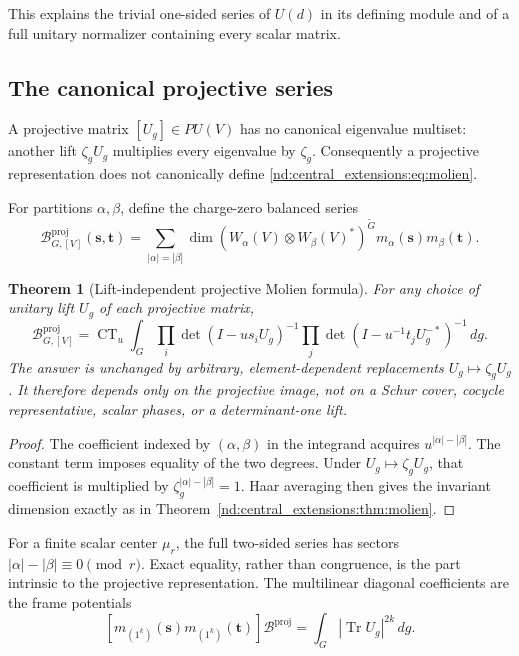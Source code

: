 \documentclass[10pt]{article}
\newcommand{\Tr}{\operatorname{Tr}}
\newcommand{\CT}{\operatorname{CT}}
\newcommand{\BSMG}{\mathcal B}
\newtheorem{theorem}{Theorem}
\begin{document}
This explains the trivial one-sided series of $U(d)$ in its defining
module and of a full unitary normalizer containing every scalar matrix.

\subsection{The canonical projective series}

A projective matrix $[U_g]\in PU(V)$ has no canonical eigenvalue multiset:
another lift $\zeta_gU_g$ multiplies every eigenvalue by $\zeta_g$.
Consequently a projective representation does not canonically define
\eqref{nd:central_extensions:eq:molien}.

For partitions $\alpha,\beta$, define the charge-zero balanced series
\begin{equation}\label{nd:central_extensions:eq:balanced-def}
 \boxed{\BSMG^{\mathrm{proj}}_{G,[V]}(\mathbf s,\mathbf t)
 =\sum_{|\alpha|=|\beta|}
 \dim\!\left(W_\alpha(V)\otimes W_\beta(V)^*\right)^{\widetilde G}
 m_\alpha(\mathbf s)m_\beta(\mathbf t).}
\end{equation}

\begin{theorem}[Lift-independent projective Molien formula]
For any choice of unitary lift $U_g$ of each projective matrix,
\begin{equation}\label{nd:central_extensions:eq:balanced-ct}
 \boxed{\BSMG^{\mathrm{proj}}_{G,[V]}
 =\CT_u\int_G
 \prod_i\det(I-u s_iU_g)^{-1}
 \prod_j\det(I-u^{-1}t_jU_g^{-*})^{-1}\,dg.}
\end{equation}
The answer is unchanged by arbitrary, element-dependent replacements
$U_g\mapsto\zeta_gU_g$.  It therefore depends only on the projective image,
not on a Schur cover, cocycle representative, scalar phases, or a
determinant-one lift.
\end{theorem}

\begin{proof}
The coefficient indexed by $(\alpha,\beta)$ in the integrand acquires
$u^{|\alpha|-|\beta|}$.  The constant term imposes equality of the two
degrees.  Under $U_g\mapsto\zeta_gU_g$, that coefficient is multiplied by
$\zeta_g^{|\alpha|-|\beta|}=1$.  Haar averaging then gives the invariant
dimension exactly as in Theorem~\ref{nd:central_extensions:thm:molien}.
\end{proof}

For a finite scalar center $\mu_r$, the full two-sided series has sectors
$|\alpha|-|\beta|\equiv0\pmod r$.  Exact equality, rather than congruence,
is the part intrinsic to the projective representation.  The multilinear
diagonal coefficients are the frame potentials
\begin{equation}\label{nd:central_extensions:eq:frame}
 [m_{(1^k)}(\mathbf s)m_{(1^k)}(\mathbf t)]\BSMG^{\mathrm{proj}}
 =\int_G|\Tr U_g|^{2k}\,dg.
\end{equation}
\end{document}
